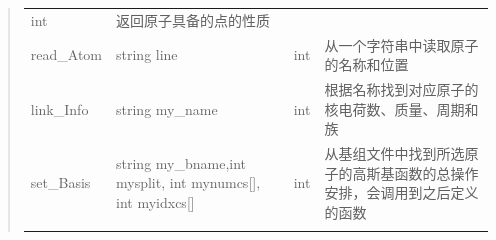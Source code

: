 \documentclass[11pt]{article}
\begin{document}
\begin{quote}
\begin{longtable}[]{@{}llll@{}}
\begin{minipage}[t]{0.06\columnwidth}
int\strut
\end{minipage} & \begin{minipage}[t]{0.43\columnwidth}\raggedright\strut
返回原子具备的点的性质\strut
\end{minipage}\tabularnewline
\begin{minipage}[t]{0.11\columnwidth}\raggedright\strut
read\_Atom\strut
\end{minipage} & \begin{minipage}[t]{0.28\columnwidth}\raggedright\strut
string line\strut
\end{minipage} & \begin{minipage}[t]{0.06\columnwidth}\raggedright\strut
int\strut
\end{minipage} & \begin{minipage}[t]{0.43\columnwidth}\raggedright\strut
从一个字符串中读取原子的名称和位置\strut
\end{minipage}\tabularnewline
\begin{minipage}[t]{0.11\columnwidth}\raggedright\strut
link\_Info\strut
\end{minipage} & \begin{minipage}[t]{0.28\columnwidth}\raggedright\strut
string my\_name\strut
\end{minipage} & \begin{minipage}[t]{0.06\columnwidth}\raggedright\strut
int\strut
\end{minipage} & \begin{minipage}[t]{0.43\columnwidth}\raggedright\strut
根据名称找到对应原子的核电荷数、质量、周期和族\strut
\end{minipage}\tabularnewline
\begin{minipage}[t]{0.11\columnwidth}\raggedright\strut
set\_Basis\strut
\end{minipage} & \begin{minipage}[t]{0.28\columnwidth}\raggedright\strut
string my\_bname,int mysplit, int mynumcs{[}{]}, int myidxcs{[}{]}\strut
\end{minipage} & \begin{minipage}[t]{0.06\columnwidth}\raggedright\strut
int\strut
\end{minipage} & \begin{minipage}[t]{0.43\columnwidth}\raggedright\strut
从基组文件中找到所选原子的高斯基函数的总操作安排，会调用到之后定义的函数\strut
\end{minipage}\tabularnewline
\begin{minipage}[t]{0.11\columnwidth}\raggedright\strut

\end{minipage}
\end{longtable}
\end{quote}
\end{document}
